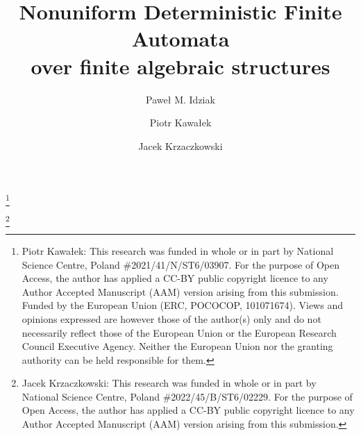\documentclass[11pt,a4paper]{amsart}
\begin{document}
\title{Nonuniform Deterministic Finite Automata \\over finite algebraic structures}


\author{Paweł M. Idziak}
\address{Department of Theoretical Computer
Science,\\ Jagiellonian University,\\
Kraków, Poland}

\author{Piotr Kawałek}
\address{Institute of Discrete Mathematics and Geometry,\\ TU Wien, Austria \\[10pt] Department of Theoretical Computer
Science,\\ Jagiellonian University,\\
Kraków, Poland}

\thanks{Piotr Kawałek: This research was funded in whole or in part by National Science Centre, Poland \#2021/41/N/ST6/03907. For the purpose of Open Access, the author has applied a CC-BY public copyright licence to
 any Author Accepted Manuscript (AAM) version arising from this submission.
Funded by the European Union (ERC, POCOCOP, 101071674). Views
 and opinions expressed are however those of the author(s) only and do not necessarily reflect those
 of the European Union or the European Research Council Executive Agency. Neither the European
 Union nor the granting authority can be held responsible for them.}

\author{Jacek Krzaczkowski}

\address{Department of Computer Science,\\
Maria Curie-Skłodowska University,\\
Lublin, Poland}
\thanks{Jacek Krzaczkowski: This research was funded in whole or in part by National Science Centre, Poland \#2022/45/B/ST6/02229. For the purpose of Open Access, the author has applied a CC-BY public copyright licence to any Author Accepted Manuscript (AAM) version arising from this submission.}
\end{document}
